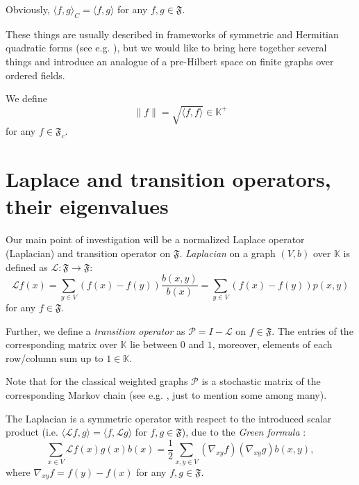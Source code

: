 \documentclass[a4paper,12pt]{amsart}
\theoremstyle{definition}
\newcommand{\K}{\mathbb{K}}
\renewcommand{\L}{\mathcal{L}}
\newcommand{\weight}{b}
\begin{document}
Obviously, $\langle f,g\rangle_C=\langle f,g\rangle$ for any $f,g\in \mathfrak F$.

These things are usually described in frameworks  of symmetric and Hermitian quadratic forms (see e.g. \cite{Lang}), but we would like to bring here together several things and introduce an  analogue of a pre-Hilbert space on finite graphs over ordered fields.

We define 
$$\|f\|=\sqrt {\langle f,f\rangle}\in \K^+
$$ 
for any $f\in  \mathfrak F_c$.


\section{Laplace and transition operators, their eigenvalues}\label{section::LP}


Our main point of investigation will be a normalized Laplace operator (Laplacian) and transition operator on $\mathfrak F$.  
\emph{Laplacian} on a graph $(V,b)$ over $\K$ is defined as $\L:\mathfrak F\to \mathfrak F$:
\begin{equation}
\mathcal L f(x)=\sum_{y\in V} (f(x)-f(y))\dfrac{\weight (x,y)}{\weight (x)}=\sum_{y\in V} (f(x)-f(y))p(x,y)
\end{equation}
for any $f \in \mathfrak F$.

Further, we define a \emph{transition operator} as  $\mathcal P=I-\mathcal L$ on $f \in \mathfrak F$. The entries of the corresponding matrix over $\K$ lie between $0$ and $1$, moreover, elements of each row/column sum up to $1\in\K$.

Note that for the classical weighted graphs $\mathcal P$ is a stochastic matrix of the corresponding Markov chain (see e.g. \cite{LPW}, \cite{Woess09} just to mention some among many). 

The Laplacian is a symmetric operator with respect to the introduced scalar product (i.e. $\langle\mathcal L f,g\rangle=\langle f,\mathcal L g\rangle$ for $f,g \in \mathfrak F$), due to the \emph{Green formula} \cite[Thm. 22]{Muranova1}:
\begin{equation*}
\sum_{x\in V}\mathcal L f(x)g(x)\weight (x)=\dfrac{1}{2}\sum_{x,y\in V}(\nabla_{xy}f)(\nabla_{xy}g)\weight (x,y),
\end{equation*}
where $\nabla_{xy}f=f(y)-f(x)$ for any $f,g \in \mathfrak F$.
\end{document}
